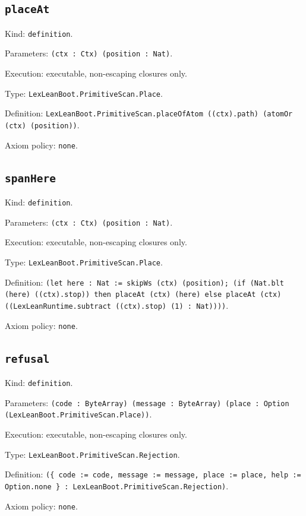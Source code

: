 \documentclass[11pt]{article}
\begin{document}
\subsection*{\texttt{placeAt}}
\noindent Kind: \texttt{definition}.\par
\noindent Parameters: \texttt{(ctx : Ctx) (position : Nat)}.\par
\noindent Execution: executable, non-escaping closures only.\par
\noindent Type: \texttt{LexLeanBoot.PrimitiveScan.Place}.\par
\noindent Definition: \texttt{LexLeanBoot.PrimitiveScan.placeOfAtom ((ctx).path) (atomOr (ctx) (position))}.\par
\noindent Axiom policy: \texttt{none}.\par
\subsection*{\texttt{spanHere}}
\noindent Kind: \texttt{definition}.\par
\noindent Parameters: \texttt{(ctx : Ctx) (position : Nat)}.\par
\noindent Execution: executable, non-escaping closures only.\par
\noindent Type: \texttt{LexLeanBoot.PrimitiveScan.Place}.\par
\noindent Definition: \texttt{(let here : Nat := skipWs (ctx) (position); (if (Nat.blt (here) ((ctx).stop)) then placeAt (ctx) (here) else placeAt (ctx) ((LexLeanRuntime.subtract ((ctx).stop) (1) : Nat))))}.\par
\noindent Axiom policy: \texttt{none}.\par
\subsection*{\texttt{refusal}}
\noindent Kind: \texttt{definition}.\par
\noindent Parameters: \texttt{(code : ByteArray) (message : ByteArray) (place : Option (LexLeanBoot.PrimitiveScan.Place))}.\par
\noindent Execution: executable, non-escaping closures only.\par
\noindent Type: \texttt{LexLeanBoot.PrimitiveScan.Rejection}.\par
\noindent Definition: \texttt{(\{ code := code, message := message, place := place, help := Option.none \} : LexLeanBoot.PrimitiveScan.Rejection)}.\par
\noindent Axiom policy: \texttt{none}.\par
\end{document}
